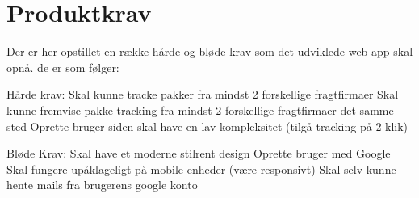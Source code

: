 \chapter{Produktkrav}
Der er her opstillet en række hårde og bløde krav som det udviklede web app skal opnå. de er som følger:

Hårde krav:
Skal kunne tracke pakker fra mindst 2 forskellige fragtfirmaer
Skal kunne fremvise pakke tracking fra mindst 2 forskellige fragtfirmaer det samme sted
Oprette bruger
siden skal have en lav kompleksitet (tilgå tracking på 2 klik)

Bløde Krav:
Skal have et moderne stilrent design
Oprette bruger med Google
Skal fungere upåklageligt på mobile enheder (være responsivt)
Skal selv kunne hente mails fra brugerens google konto
